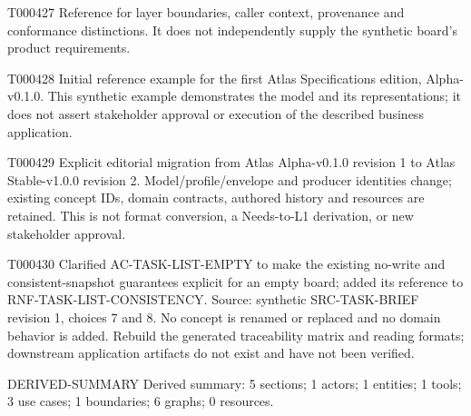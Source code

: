 \documentclass[11pt,a4paper]{article}
\begin{document}
\begin{atlasparagraph}{T000427}
Reference for layer boundaries, caller context, provenance and conformance distinctions. It does not independently supply the synthetic board's product requirements.
\end{atlasparagraph}
\begin{atlasparagraph}{T000428}
Initial reference example for the first Atlas Specifications edition, Alpha-v0.1.0. This synthetic example demonstrates the model and its representations; it does not assert stakeholder approval or execution of the described business application.
\end{atlasparagraph}
\begin{atlasparagraph}{T000429}
Explicit editorial migration from Atlas Alpha-v0.1.0 revision 1 to Atlas Stable-v1.0.0 revision 2. Model/profile/envelope and producer identities change; existing concept IDs, domain contracts, authored history and resources are retained. This is not format conversion, a Needs-to-L1 derivation, or new stakeholder approval.
\end{atlasparagraph}
\begin{atlasparagraph}{T000430}
Clarified AC-TASK-LIST-EMPTY to make the existing no-write and consistent-snapshot guarantees explicit for an empty board; added its reference to RNF-TASK-LIST-CONSISTENCY. Source: synthetic SRC-TASK-BRIEF revision 1, choices 7 and 8. No concept is renamed or replaced and no domain behavior is added. Rebuild the generated traceability matrix and reading formats; downstream application artifacts do not exist and have not been verified.
\end{atlasparagraph}
\begin{atlasderived}{DERIVED-SUMMARY}
Derived summary: 5 sections; 1 actors; 1 entities; 1 tools; 3 use cases; 1 boundaries; 6 graphs; 0 resources.
\end{atlasderived}
\end{document}

